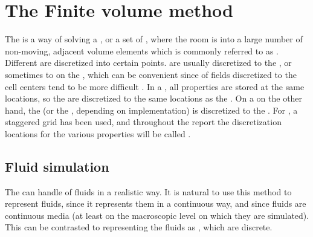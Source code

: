 \chapter{The Finite volume method}
\label{chap:thefinitevolumemethod}



The \FVM is a way of solving a \PDE, or a set of \PDEs, where the room is \discretized into a large number of non-moving, adjacent volume elements which is commonly referred to as \cells. Different \properties are discretized into certain points.  are usually discretized to the , or sometimes to  on the , which can be convenient since \interpolation of fields discretized to the cell centers tend to be more difficult \citep{Losasso2004}. In a , all properties are stored at the same locations, so the  are discretized to the same locations as the . On a  on the other hand, the \velocity (or the \momentum, depending on implementation) is discretized to the . For \thisprojectwork, a staggered grid has been used, and throughout the report the discretization locations for the various properties will be called .

\section{Fluid simulation}

The \FVM can handle \simulation of fluids in a realistic way. It is natural to use this method to represent fluids, since it represents them in a continuous way, and since fluids are continuous media (at least on the macroscopic level on which they are simulated). This can be contrasted to representing the fluids as , which are discrete.

